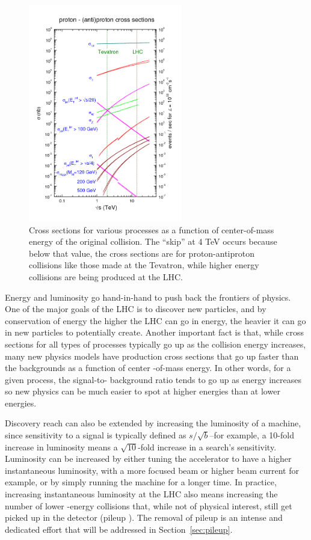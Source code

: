 \begin{figure}
	\centering
	\includegraphics[width=0.6\textwidth]{ATLASDetector/images/crosssections2008.png}
	\caption{Cross sections for various processes as a function of center-of-mass energy
            of the original collision.  The ``skip'' at 4 TeV occurs because below that
            value, the cross sections are for proton-antiproton collisions like those
            made at the Tevatron, while higher energy collisions are being produced
            at the LHC. \label{fig:cross_sections}}
\end{figure}


Energy and luminosity go hand-in-hand to push back the frontiers of physics.  One of the 
major goals of the LHC is to discover new particles, and by conservation of energy the higher the LHC 
can go in energy, the heavier it can go in new particles to potentially create.  Another important fact 
is that, while cross sections for all types of processes typically go up as the collision energy increases, 
many new physics models have production cross sections that go up faster than the backgrounds as a function of center
-of-mass energy.  In other words, for a given process, the signal-to-
background ratio tends to go up as energy increases so new physics can be much easier to spot at higher 
energies than at lower energies.   

Discovery reach can also be extended by increasing the luminosity of a machine, 
since sensitivity to a signal is typically defined as $s/\sqrt{b}$--for example, a 
10-fold increase in luminosity means a $\sqrt{10}$-fold increase in a search's sensitivity.  
Luminosity can be increased by either tuning the accelerator to have a higher instantaneous luminosity, with a more focused 
beam or higher beam current for example, or by simply running the machine for a longer time.  In 
practice, increasing instantaneous luminosity at the LHC also means increasing the number of lower
-energy collisions that, while not of physical interest, still get picked up in the detector (pileup
).  The removal of pileup is an intense and dedicated effort that will be addressed in Section~\ref{sec:pileup}.




